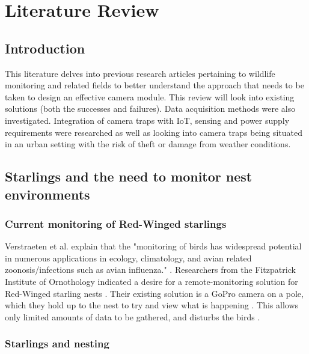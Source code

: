 \documentclass[class=report,11pt,crop=false]{standalone}
\begin{document}
\ifstandalone
\tableofcontents
\fi
\chapter{Literature Review \label{ch:literature}}

\section{Introduction}

This literature delves into previous research articles pertaining to wildlife monitoring and related fields to better understand the approach that needs to be taken to design an effective camera module. This review will look into existing solutions (both the successes and failures). Data acquisition methods were also investigated. Integration of camera traps with IoT, sensing and power supply requirements were researched as well as looking into camera traps being situated in an urban setting with the risk of theft or damage from weather conditions. 


\section{Starlings and the need to monitor nest environments}

\subsection{Current monitoring of Red-Winged starlings}

Verstraeten et al. explain that the "monitoring of birds has widespread potential in numerous applications in ecology, climatology, and avian related zoonosis/infections such as avian influenza." \cite{verstraeten2010webcams}. Researchers from the Fitzpatrick Institute of Ornothology indicated a desire for a remote-monitoring solution for Red-Winged starling nests \cite{hofmeyer2024private}. Their existing solution is a GoPro camera on a pole, which they hold up to the nest to try and view what is happening \cite{hofmeyer2024private}. This allows only limited amounts of data to be gathered, and disturbs the birds \cite{hofmeyer2024private}.

\subsection{Starlings and nesting}
\end{document}
